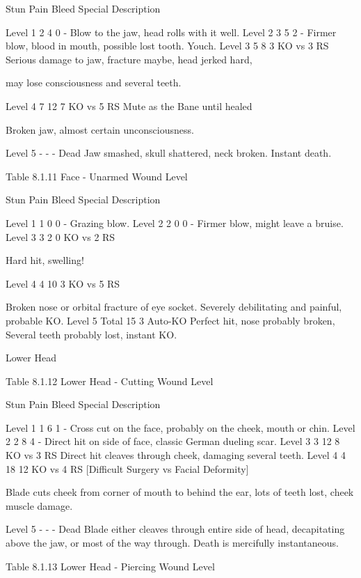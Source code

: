\documentclass[oneside,11pt,english]{book}
\begin{document}
Stun Pain Bleed Special Description 

Level 1 2 4 0 - Blow to the jaw, head rolls with it well. 
Level 2 3 5 2 - Firmer blow, blood in mouth, possible lost tooth. Youch. 
Level 3 5 8 3 KO vs 3 RS Serious damage to jaw, fracture maybe, head jerked hard, 


may lose consciousness and several teeth. 

Level 4 7 12 7 KO vs 5 RS 
Mute as the Bane 
until healed 

Broken jaw, almost certain unconsciousness. 

Level 5 - - - Dead Jaw smashed, skull shattered, neck broken. Instant death. 

 
Table 8.1.11 Face - Unarmed 
Wound 
Level 

Stun Pain Bleed Special Description 

Level 1 1 0 0 - Grazing blow. 
Level 2 2 0 0 - Firmer blow, might leave a bruise. 
Level 3 3 2 0 KO vs 2 
RS 

Hard hit, swelling! 

Level 4 4 10 3 KO vs 5 
RS 

Broken nose or orbital fracture of eye socket. Severely 
debilitating and painful, probable KO. 
Level 5 Total 15 3 Auto-KO Perfect hit, nose probably broken, Several teeth probably lost, 
instant KO. 

 

 

 

 

Lower Head 

 
Table 8.1.12 Lower Head - Cutting 
Wound 
Level 

Stun Pain Bleed Special Description 

Level 1 1 6 1 - Cross cut on the face, probably on the cheek, mouth or 
chin. 
Level 2 2 8 4 - Direct hit on side of face, classic German dueling scar. 
Level 3 3 12 8 KO vs 3 RS Direct hit cleaves through cheek, damaging several teeth. 
Level 4 4 18 12 KO vs 4 RS 
[Difficult Surgery vs 
Facial Deformity] 

Blade cuts cheek from corner of mouth to behind the ear, 
lots of teeth lost, cheek muscle damage. 

Level 5 - - - Dead Blade either cleaves through entire side of head, 
decapitating above the jaw, or most of the way through. 
Death is mercifully instantaneous. 

 


Table 8.1.13 Lower Head - Piercing 
Wound 
Level 
\end{document}
